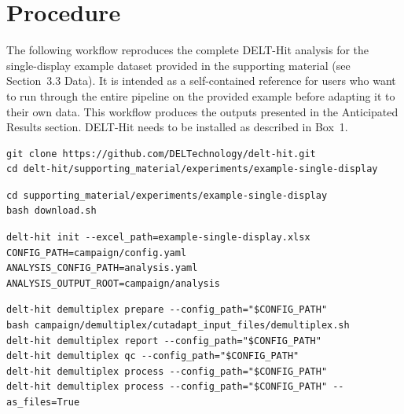 \section{Procedure}

\begin{tcolorbox}[
  colback=blue!5,
  colframe=blue!40,
  breakable,
  title=Box 2 | Quickstart: single-display example workflow,
  fonttitle=\bfseries
]

The following workflow reproduces the complete DELT-Hit analysis for the single-display example dataset provided in the supporting material (see Section~3.3 Data). It is intended as a self-contained reference for users who want to run through the entire pipeline on the provided example before adapting it to their own data. This workflow produces the outputs presented in the Anticipated Results section. DELT-Hit needs to be installed as described in Box~1.


\begin{lstlisting}
git clone https://github.com/DELTechnology/delt-hit.git
cd delt-hit/supporting_material/experiments/example-single-display
\end{lstlisting}


\begin{lstlisting}
cd supporting_material/experiments/example-single-display
bash download.sh
\end{lstlisting}


\begin{lstlisting}
delt-hit init --excel_path=example-single-display.xlsx
CONFIG_PATH=campaign/config.yaml
ANALYSIS_CONFIG_PATH=analysis.yaml
ANALYSIS_OUTPUT_ROOT=campaign/analysis
\end{lstlisting}


\begin{lstlisting}
delt-hit demultiplex prepare --config_path="$CONFIG_PATH"
bash campaign/demultiplex/cutadapt_input_files/demultiplex.sh
delt-hit demultiplex report --config_path="$CONFIG_PATH"
delt-hit demultiplex qc --config_path="$CONFIG_PATH"
delt-hit demultiplex process --config_path="$CONFIG_PATH"
delt-hit demultiplex process --config_path="$CONFIG_PATH" --as_files=True
\end{lstlisting}


\end{tcolorbox}
